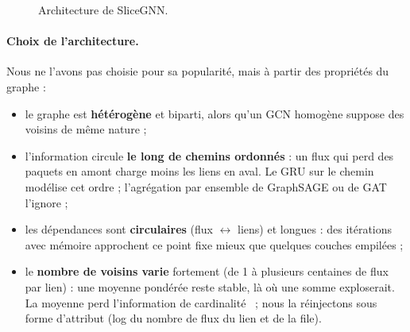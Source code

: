 \documentclass[11pt,a4paper]{report}
\begin{document}
\begin{figure}[H]
\centering
{}
\caption{Architecture de SliceGNN.}
\label{fig:archi}
\end{figure}

\paragraph{Choix de l'architecture.} Nous ne l'avons pas choisie pour sa popularité, mais à partir des propriétés du graphe :
\begin{itemize}[nosep]
  \item le graphe est \textbf{hétérogène} et biparti, alors qu'un GCN homogène suppose des voisins de même nature ;
  \item l'information circule \textbf{le long de chemins ordonnés} : un flux qui perd des paquets en amont charge moins les liens en aval. Le GRU sur le chemin modélise cet ordre ; l'agrégation par ensemble de GraphSAGE ou de GAT l'ignore ;
  \item les dépendances sont \textbf{circulaires} (flux $\leftrightarrow$ liens) et longues : des itérations avec mémoire approchent ce point fixe mieux que quelques couches empilées ;
  \item le \textbf{nombre de voisins varie} fortement (de 1 à plusieurs centaines de flux par lien) : une moyenne pondérée reste stable, là où une somme exploserait. La moyenne perd l'information de cardinalité~\cite{gin} ; nous la réinjectons sous forme d'attribut (log du nombre de flux du lien et de la file).
\end{itemize}
\end{document}
